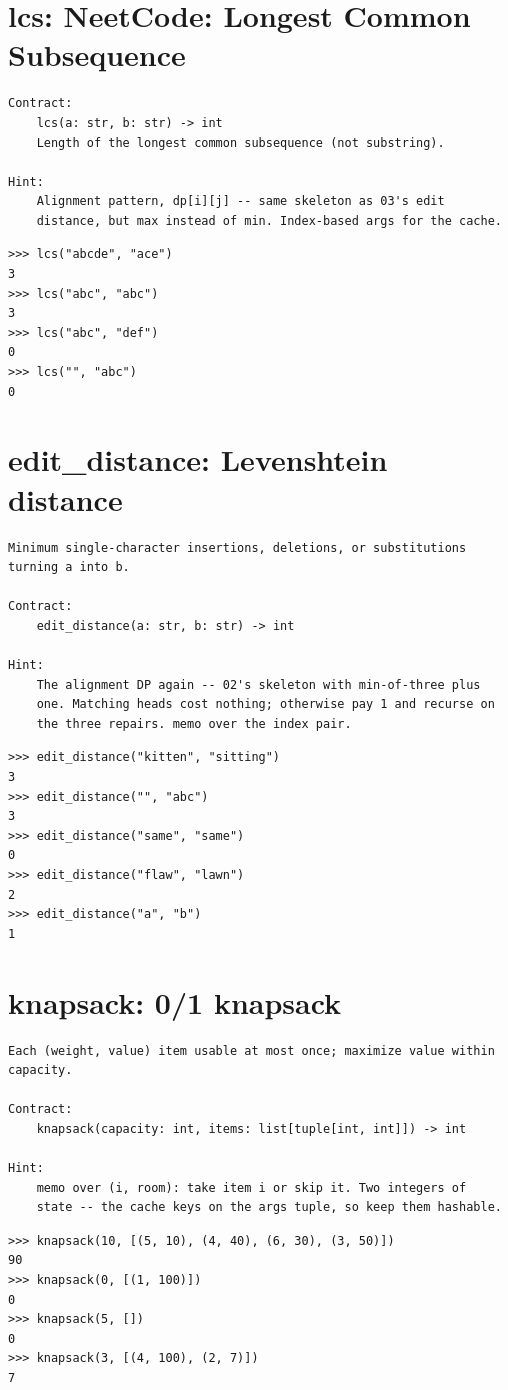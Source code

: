\documentclass[10pt,letterpaper]{book}
\begin{document}
\section{lcs: NeetCode: Longest Common Subsequence}
\begin{lstlisting}[style=ex]
Contract:
    lcs(a: str, b: str) -> int
    Length of the longest common subsequence (not substring).

Hint:
    Alignment pattern, dp[i][j] -- same skeleton as 03's edit
    distance, but max instead of min. Index-based args for the cache.
\end{lstlisting}
\begin{lstlisting}[style=ex]
>>> lcs("abcde", "ace")
3
>>> lcs("abc", "abc")
3
>>> lcs("abc", "def")
0
>>> lcs("", "abc")
0
\end{lstlisting}

\section{edit\_distance: Levenshtein distance}
\begin{lstlisting}[style=ex]
Minimum single-character insertions, deletions, or substitutions
turning a into b.

Contract:
    edit_distance(a: str, b: str) -> int

Hint:
    The alignment DP again -- 02's skeleton with min-of-three plus
    one. Matching heads cost nothing; otherwise pay 1 and recurse on
    the three repairs. memo over the index pair.
\end{lstlisting}
\begin{lstlisting}[style=ex]
>>> edit_distance("kitten", "sitting")
3
>>> edit_distance("", "abc")
3
>>> edit_distance("same", "same")
0
>>> edit_distance("flaw", "lawn")
2
>>> edit_distance("a", "b")
1
\end{lstlisting}

\section{knapsack: 0/1 knapsack}
\begin{lstlisting}[style=ex]
Each (weight, value) item usable at most once; maximize value within
capacity.

Contract:
    knapsack(capacity: int, items: list[tuple[int, int]]) -> int

Hint:
    memo over (i, room): take item i or skip it. Two integers of
    state -- the cache keys on the args tuple, so keep them hashable.
\end{lstlisting}
\begin{lstlisting}[style=ex]
>>> knapsack(10, [(5, 10), (4, 40), (6, 30), (3, 50)])
90
>>> knapsack(0, [(1, 100)])
0
>>> knapsack(5, [])
0
>>> knapsack(3, [(4, 100), (2, 7)])
7
\end{lstlisting}
\end{document}

